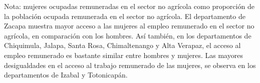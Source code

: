 Nota: mujeres ocupadas remuneradas en el sector no agrícola como proporción de la población ocupada remunerada en el sector no agrícola. El departamento de Zacapa muestra mayor acceso a las mujeres al empleo remunerado en el sector no agrícola, en comparación con los hombres. Así también, en los departamentos de Chiquimula, Jalapa, Santa Rosa, Chimaltenango y Alta Verapaz, el acceso al empleo remunerado es bastante similar entre hombres y mujeres. Las mayores desigualdades en el acceso al trabajo remunerado de las mujeres, se observa en los departamentos de Izabal y Totonicapán.
